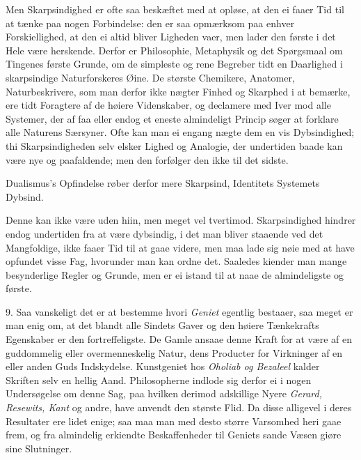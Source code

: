 \documentclass[12pt,a4paper]{article}
\newcommand{\opage}[1]{\marginnote{\footnotesize\textit{[#1]}}}
\begin{document}
Men Skarpsindighed er ofte saa beskæftet med at opløse, at den ei faaer Tid til at tænke
paa nogen Forbindelse: den er saa opmærksom paa enhver Forskiellighed, at den ei altid
bliver Ligheden vaer, men lader den første i det Hele være herskende. Derfor er
Philosophie, Metaphysik og det Spørgsmaal om Tingenes første Grunde, om de simpleste og
rene Begreber tidt en Daarlighed i skarpsindige Naturforskeres Øine. De største
Chemikere, Anatomer, Naturbeskrivere, som man derfor ikke nægter Finhed og Skarphed i at
bemærke, ere tidt Foragtere af de høiere Videnskaber, og declamere med Iver mod alle
Systemer, der af faa eller endog et eneste almindeligt Princip søger at forklare alle
Naturens Særsyner. Ofte kan man ei engang nægte dem en vis Dybsindighed; thi
Skarpsindigheden selv elsker Lighed og Analogie, der undertiden baade kan være nye og
paafaldende; men den forfølger den ikke til det sidste.

\opage{171} Dualismus's Opfindelse røber derfor mere Skarpsind, Identitets Systemets Dybsind.

Denne kan ikke være uden hiin, men meget vel tvertimod. Skarpsindighed hindrer endog
undertiden fra at være dybsindig, i det man bliver staaende ved det Mangfoldige, ikke
faaer Tid til at gaae videre, men maa lade sig nøie med at have opfundet visse Fag,
hvorunder man kan ordne det. Saaledes kiender man mange besynderlige Regler og Grunde, men
er ei istand til at naae de almindeligste og første.

9. Saa vanskeligt det er at bestemme hvori \emph{Geniet} egentlig bestaaer, saa meget er
man enig om, at det blandt alle Sindets Gaver og den høiere Tænkekrafts Egenskaber er den
fortreffeligste. De Gamle ansaae denne Kraft for at være af en guddommelig eller
overmenneskelig Natur, dens Producter for Virkninger af en eller anden Guds Indskydelse.
Kunstgeniet hos \emph{Oholiab og Bezaleel} kalder Skriften selv en hellig Aand.
Philosopherne indlode sig derfor ei i nogen Undersøgelse om denne Sag, paa hvilken derimod
adskillige Nyere \emph{Gerard, Resewits, Kant} og andre, have anvendt den største Flid. Da
disse alligevel i deres Resultater ere lidet enige; saa maa man med desto større
Varsomhed heri gaae frem, og fra almindelig erkiendte Beskaffenheder til Geniets sande
Væsen giøre sine Slutninger.
\end{document}
